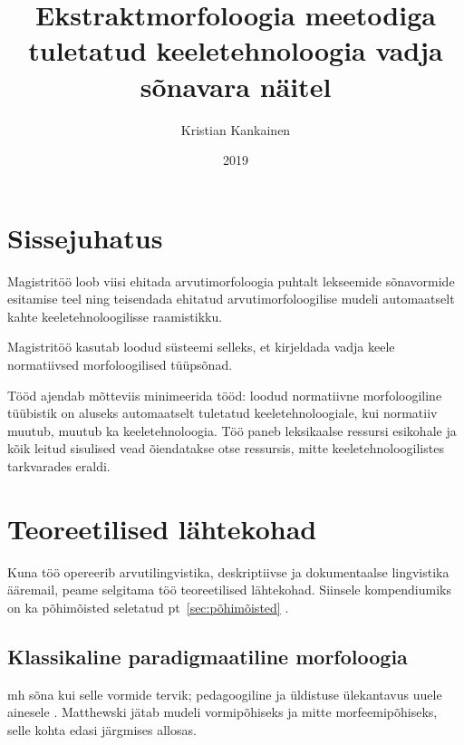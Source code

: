 \documentclass[12pt,a4paper]{article}
\begin{document}
\title{Ekstraktmorfoloogia meetodiga tuletatud keeletehnoloogia vadja sõnavara näitel}
\author{Kristian Kankainen}
\date{2019}
\maketitle


\newpage
\tableofcontents



\newpage
{}
\section{Sissejuhatus}

Magistritöö loob viisi ehitada arvutimorfoloogia puhtalt lekseemide sõnavormide esitamise teel ning teisendada ehitatud arvutimorfoloogilise mudeli automaatselt kahte keeletehnoloogilisse raamistikku.

Magistritöö kasutab loodud süsteemi selleks, et kirjeldada vadja keele normatiivsed morfoloogilised tüüpsõnad.

Tööd ajendab mõtteviis minimeerida tööd: loodud normatiivne morfoloogiline tüübistik on aluseks automaatselt tuletatud keeletehnoloogiale, kui normatiiv muutub, muutub ka keeletehnoloogia. Töö paneb leksikaalse ressursi esikohale ja kõik leitud sisulised vead õiendatakse otse ressursis, mitte keeletehnoloogilistes tarkvarades eraldi.




\newpage
\section{Teoreetilised lähtekohad}
Kuna töö opereerib arvutilingvistika, deskriptiivse ja dokumentaalse lingvistika ääremail, peame selgitama töö teoreetilised lähtekohad. Siinsele kompendiumiks on ka põhimõisted seletatud pt~\ref{sec:põhimõisted} .

\subsection{Klassikaline paradigmaatiline morfoloogia}
mh sõna kui selle vormide tervik; pedagoogiline ja üldistuse ülekantavus uuele ainesele \cite{matthews_morphology_1991}. Matthewski jätab mudeli vormipõhiseks ja mitte morfeemipõhiseks, selle kohta edasi järgmises allosas.
\end{document}
